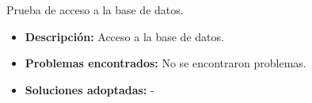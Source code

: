 \item Prueba de acceso a la base de datos.
  \begin{itemize}
    \item \textbf{Descripción:} Acceso a la base de datos.
    \item \textbf{Problemas encontrados:} No se encontraron problemas.
    \item \textbf{Soluciones adoptadas:} -
  \end{itemize}


